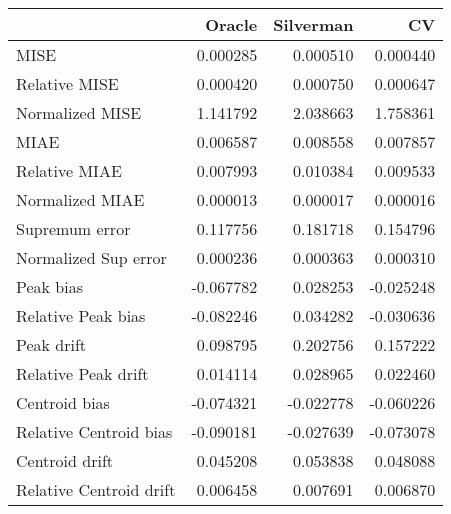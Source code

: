 \begin{tabular}{lrrr}
  \toprule
 & Oracle & Silverman & CV \\ 
  \midrule
MISE & 0.000285 & 0.000510 & 0.000440 \\ 
  Relative MISE & 0.000420 & 0.000750 & 0.000647 \\ 
  Normalized MISE & 1.141792 & 2.038663 & 1.758361 \\ 
  MIAE & 0.006587 & 0.008558 & 0.007857 \\ 
  Relative MIAE & 0.007993 & 0.010384 & 0.009533 \\ 
  Normalized MIAE & 0.000013 & 0.000017 & 0.000016 \\ 
  Supremum error & 0.117756 & 0.181718 & 0.154796 \\ 
  Normalized Sup error & 0.000236 & 0.000363 & 0.000310 \\ 
  Peak bias & -0.067782 & 0.028253 & -0.025248 \\ 
  Relative Peak bias & -0.082246 & 0.034282 & -0.030636 \\ 
  Peak drift & 0.098795 & 0.202756 & 0.157222 \\ 
  Relative Peak drift & 0.014114 & 0.028965 & 0.022460 \\ 
  Centroid bias & -0.074321 & -0.022778 & -0.060226 \\ 
  Relative Centroid bias & -0.090181 & -0.027639 & -0.073078 \\ 
  Centroid drift & 0.045208 & 0.053838 & 0.048088 \\ 
  Relative Centroid drift & 0.006458 & 0.007691 & 0.006870 \\ 
   \bottomrule
\end{tabular}
